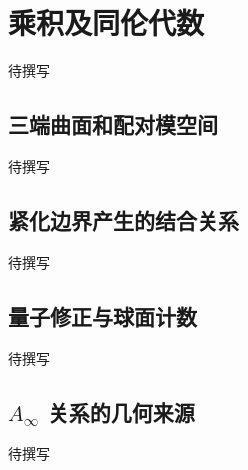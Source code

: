 
% 
% 
% 
% 
% 

\section{乘积及同伦代数}
\label{g4:sec:2803}

待撰写

\subsection{三端曲面和配对模空间}
\label{g4:subsec:2803:01}
待撰写

\subsection{紧化边界产生的结合关系}
\label{g4:subsec:2803:02}
待撰写

\subsection{量子修正与球面计数}
\label{g4:subsec:2803:03}
待撰写

\subsection{\texorpdfstring{\(A_\infty\) 关系的几何来源}{A∞ 关系的几何来源}}
\label{g4:subsec:2803:04}
待撰写

